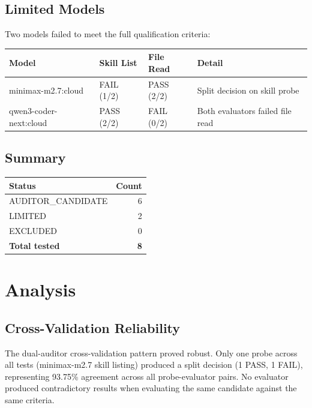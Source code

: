 \documentclass[11pt,a4paper]{article}
\begin{document}
\subsection{Limited Models}

Two models failed to meet the full qualification criteria:

\begin{center}
\begin{tabular}{l l l l}
\toprule
\textbf{Model} & \textbf{Skill List} & \textbf{File Read} & \textbf{Detail} \\
\midrule
minimax-m2.7:cloud & FAIL (1/2) & PASS (2/2) & Split decision on skill probe \\
qwen3-coder-next:cloud & PASS (2/2) & FAIL (0/2) & Both evaluators failed file read \\
\bottomrule
\end{tabular}
\end{center}

\subsection{Summary}

\begin{center}
\begin{tabular}{l r}
\toprule
\textbf{Status} & \textbf{Count} \\
\midrule
AUDITOR\_CANDIDATE & 6 \\
LIMITED & 2 \\
EXCLUDED & 0 \\
\midrule
\textbf{Total tested} & \textbf{8} \\
\bottomrule
\end{tabular}
\end{center}

\section{Analysis}

\subsection{Cross-Validation Reliability}

The dual-auditor cross-validation pattern proved robust. Only one probe across all tests (minimax-m2.7 skill listing) produced a split decision (1 PASS, 1 FAIL), representing 93.75\% agreement across all probe-evaluator pairs. No evaluator produced contradictory results when evaluating the same candidate against the same criteria.
\end{document}
